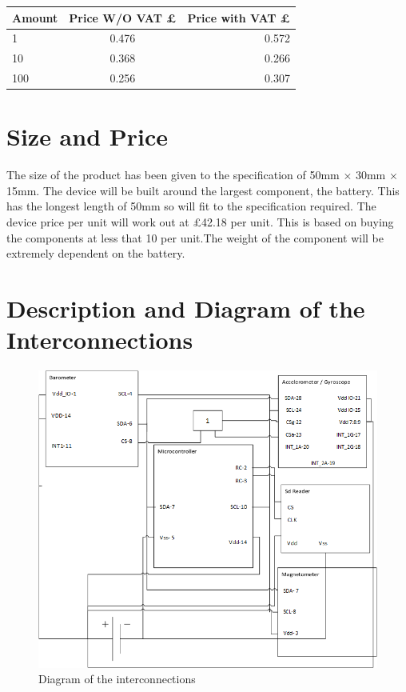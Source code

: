 \documentclass{report}
\begin{document}
\begin{center}
  \begin{tabular}{ | l | c | r |}
    \hline
    Amount & Price W/O VAT £ & Price with VAT £ \\ \hline
    1 & 0.476 & 0.572 \\ \hline
    10 & 0.368 & 0.266 \\ \hline
    100 & 0.256 & 0.307 \\ \hline
	\end{tabular}
\end{center}


\section{Size and Price}
The size of the product  has been given to the specification of 50mm × 30mm × 15mm. The device will be built around the largest component, the battery. This has the longest length of 50mm so will fit to the specification required.
The device price per unit will work out at £42.18 per unit. This is based on buying the components at less that 10 per unit.The weight of the component will be extremely dependent on the battery.
\section{Description and Diagram of the Interconnections}

\begin{figure}[ht!]
\centering
\includegraphics[width=115mm]{MainImage.png}
\caption{Diagram of the interconnections}
\label{overflow}
\end{figure}
\end{document}
